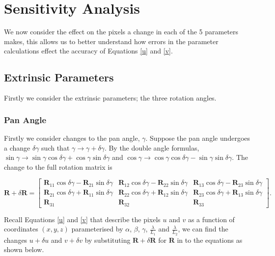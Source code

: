 \documentclass[12pt]{article}
\newcommand{\mtx}[1]{\ensuremath{\mathbf{#1}}}
\begin{document}
\section{Sensitivity Analysis}

We now consider the effect on the pixels a change in each of the 5 parameters makes, this allows us to better understand how errors in the parameter calculations effect the accuracy of Equations \ref{u} and \ref{v}.

\subsection{Extrinsic Parameters}
Firstly we consider the extrinsic parameters; the three rotation angles.

\subsubsection{Pan Angle}
Firstly we consider changes to the pan angle, $\gamma$. Suppose the pan angle undergoes a change $\delta\gamma$ such that $\gamma \rightarrow \gamma + \delta\gamma$. By the double angle formulas, $\sin\gamma\rightarrow\sin\gamma\cos\delta\gamma + \cos\gamma\sin\delta\gamma$ and $\cos\gamma\rightarrow\cos\gamma\cos\delta\gamma - \sin\gamma\sin\delta\gamma$. The change to the full rotation matrix is

\begin{equation}
 \mtx{R} + \delta\mtx{R} =
  \begin{bmatrix}
    \mtx{R}_{11}\cos\delta\gamma - \mtx{R}_{21}\sin\delta\gamma & \mtx{R}_{12}\cos\delta\gamma - \mtx{R}_{22}\sin\delta\gamma & \mtx{R}_{13}\cos\delta\gamma - \mtx{R}_{23}\sin\delta\gamma \\

    \mtx{R}_{21}\cos\delta\gamma + \mtx{R}_{11}\sin\delta\gamma & \mtx{R}_{22}\cos\delta\gamma + \mtx{R}_{12}\sin\delta\gamma & \mtx{R}_{23}\cos\delta\gamma + \mtx{R}_{13}\sin\delta\gamma \\

    \mtx{R}_{31} & \mtx{R}_{32} & \mtx{R}_{33}
 \end{bmatrix}.
\end{equation}

Recall Equations \ref{u} and \ref{v} that describe the pixels $u$ and $v$ as a function of coordinates $(x,y,z)$ parameterised by $\alpha$, $\beta$, $\gamma$, $\frac{\lambda}{L_1}$ and $\frac{\lambda}{L_2}$, we can find the changes $u + \delta u$ and $v + \delta v$ by substituting $\mtx{R} + \delta\mtx{R}$ for $\mtx{R}$ in to the equations as shown below.
\end{document}
